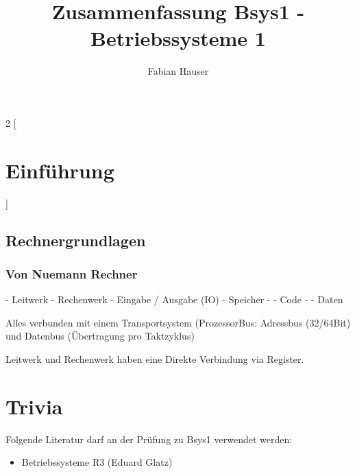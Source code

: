 

\title{Zusammenfassung Bsys1 - Betriebssysteme 1}
\author{Fabian Hauser}
 

\maketitle
\begin{multicols}{2}
[
\section{Einführung}
]

\subsection{Rechnergrundlagen}

\subsubsection{Von Nuemann Rechner}

- Leitwerk
- Rechenwerk
- Eingabe / Ausgabe (IO)
- Speicher
 - - Code
 - - Daten

Alles verbunden mit einem Transportsystem (ProzessorBus: Adressbus (32/64Bit) und Datenbus (Übertragung pro Taktzyklus)

Leitwerk und Rechenwerk haben eine Direkte Verbindung via Register.

\end{multicols}

\section{Trivia}
Folgende Literatur darf an der Prüfung zu Bsys1 verwendet werden:
\begin{itemize}
	\item Betriebssysteme R3 (Eduard Glatz)
\end{itemize}



